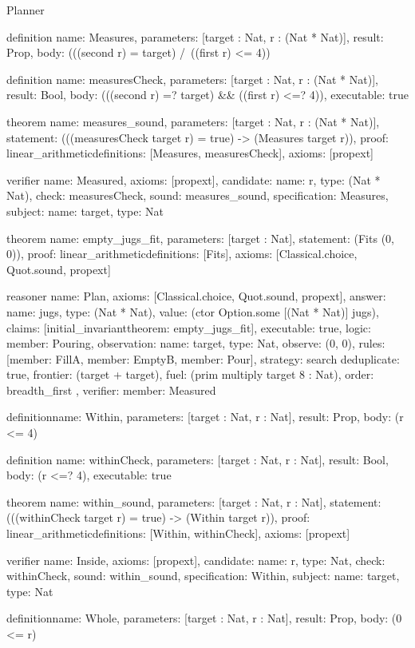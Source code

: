\begin{lexlean}{Planner}
\begin{semanticmodule}
definition{
  name: Measures,
  parameters: [target : Nat, r : (Nat * Nat)],
  result: Prop,
  body: (((second r) = target) /\ ((first r) <= 4))
}

definition{
  name: measuresCheck,
  parameters: [target : Nat, r : (Nat * Nat)],
  result: Bool,
  body: (((second r) =? target) && ((first r) <=? 4)),
  executable: true
}

theorem{
  name: measures_sound,
  parameters: [target : Nat, r : (Nat * Nat)],
  statement: (((measuresCheck target r) = true) -> (Measures target r)),
  proof: linear_arithmetic{definitions: [Measures, measuresCheck]},
  axioms: [propext]
}

verifier{
  name: Measured,
  axioms: [propext],
  candidate: {name: r, type: (Nat * Nat)},
  check: measuresCheck,
  sound: measures_sound,
  specification: Measures,
  subject: {name: target, type: Nat}
}

theorem{
  name: empty_jugs_fit,
  parameters: [target : Nat],
  statement: (Fits (0, 0)),
  proof: linear_arithmetic{definitions: [Fits]},
  axioms: [Classical.choice, Quot.sound, propext]
}

reasoner{
  name: Plan,
  axioms: [Classical.choice, Quot.sound, propext],
  answer: {name: jugs, type: (Nat * Nat), value: (ctor Option.some [(Nat * Nat)] jugs)},
  claims: [initial_invariant{theorem: empty_jugs_fit}],
  executable: true,
  logic: {member: Pouring},
  observation: {name: target, type: Nat},
  observe: (0, 0),
  rules: [{member: FillA}, {member: EmptyB}, {member: Pour}],
  strategy: search{
    deduplicate: true,
    frontier: (target + target),
    fuel: (prim multiply target 8 : Nat),
    order: breadth_first
  },
  verifier: {member: Measured}
}

definition{name: Within, parameters: [target : Nat, r : Nat], result: Prop, body: (r <= 4)}

definition{
  name: withinCheck,
  parameters: [target : Nat, r : Nat],
  result: Bool,
  body: (r <=? 4),
  executable: true
}

theorem{
  name: within_sound,
  parameters: [target : Nat, r : Nat],
  statement: (((withinCheck target r) = true) -> (Within target r)),
  proof: linear_arithmetic{definitions: [Within, withinCheck]},
  axioms: [propext]
}

verifier{
  name: Inside,
  axioms: [propext],
  candidate: {name: r, type: Nat},
  check: withinCheck,
  sound: within_sound,
  specification: Within,
  subject: {name: target, type: Nat}
}

definition{name: Whole, parameters: [target : Nat, r : Nat], result: Prop, body: (0 <= r)}


\end{semanticmodule}
\end{lexlean}
